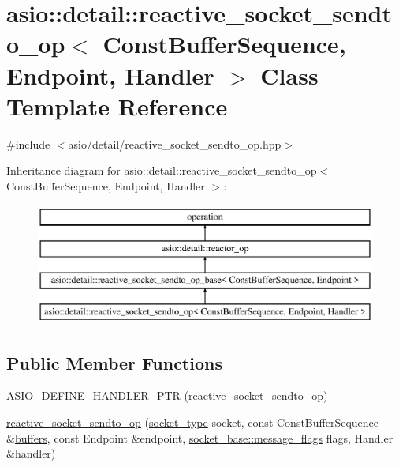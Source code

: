 \hypertarget{classasio_1_1detail_1_1reactive__socket__sendto__op}{}\section{asio\+:\+:detail\+:\+:reactive\+\_\+socket\+\_\+sendto\+\_\+op$<$ Const\+Buffer\+Sequence, Endpoint, Handler $>$ Class Template Reference}
\label{classasio_1_1detail_1_1reactive__socket__sendto__op}


{\ttfamily \#include $<$asio/detail/reactive\+\_\+socket\+\_\+sendto\+\_\+op.\+hpp$>$}

Inheritance diagram for asio\+:\+:detail\+:\+:reactive\+\_\+socket\+\_\+sendto\+\_\+op$<$ Const\+Buffer\+Sequence, Endpoint, Handler $>$\+:\begin{figure}[H]
\begin{center}
\leavevmode
\includegraphics[height=4.000000cm]{classasio_1_1detail_1_1reactive__socket__sendto__op}
\end{center}
\end{figure}
\subsection*{Public Member Functions}
\begin{DoxyCompactItemize}
\item 
\hyperlink{classasio_1_1detail_1_1reactive__socket__sendto__op_aba167322f5af27dedd7061370eba40b4}{A\+S\+I\+O\+\_\+\+D\+E\+F\+I\+N\+E\+\_\+\+H\+A\+N\+D\+L\+E\+R\+\_\+\+P\+T\+R} (\hyperlink{classasio_1_1detail_1_1reactive__socket__sendto__op}{reactive\+\_\+socket\+\_\+sendto\+\_\+op})
\item 
\hyperlink{classasio_1_1detail_1_1reactive__socket__sendto__op_a355645ce5bcdea5b9d951150d6584b17}{reactive\+\_\+socket\+\_\+sendto\+\_\+op} (\hyperlink{namespaceasio_1_1detail_a6798c771dd84b79798b1a08150706ea9}{socket\+\_\+type} socket, const Const\+Buffer\+Sequence \&\hyperlink{group__async__read_ga54dede45c3175148a77fe6635222c47d}{buffers}, const Endpoint \&endpoint, \hyperlink{classasio_1_1socket__base_ac3cf77465dfedfe1979b5415cf32cc94}{socket\+\_\+base\+::message\+\_\+flags} flags, Handler \&handler)
\end{DoxyCompactItemize}
